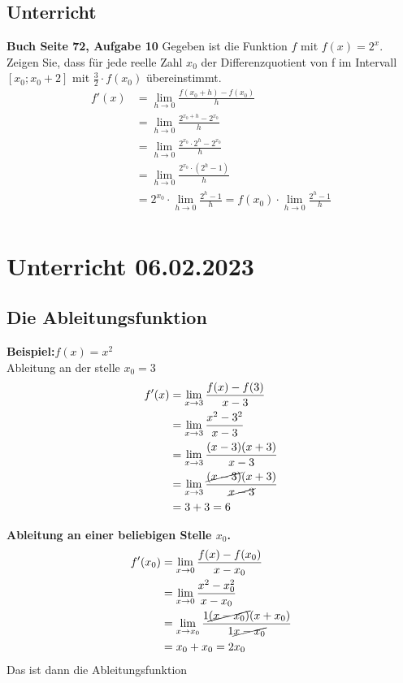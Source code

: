 \documentclass{book}
\begin{document}
\subsection{Unterricht}
\textbf{Buch Seite 72, Aufgabe 10}
Gegeben ist die Funktion $f$ mit $f(x)=2^x$. Zeigen Sie, dass für jede reelle Zahl $x_0$ der Differenzquotient von f im Intervall $[x_0; x_0+2]$ mit $\frac{3}{2}\cdot f(x_0)$ übereinstimmt. 
\begin{align*}
    f'(x) &= \lim_{h \to 0}\frac{f(x_0+h)-f(x_0)}{h} \\
          &= \lim_{h \to 0}\frac{2^{x_0+h}-2^{x_0}}{h} \\
          &= \lim_{h \to 0}\frac{2^{x_0}\cdot 2^h-2^{x_0}}{h} \\
          &= \lim_{h \to 0}\frac{2^{x_0}\cdot (2^h-1)}{h} \\
          &= 2^{x_0}\cdot \lim_{h \to 0}\frac{2^h-1}{h}=f(x_0)\cdot \lim_{h \to 0}\frac{2^h-1}{h} \\
\end{align*}

\section{Unterricht 06.02.2023}
\subsection{Die Ableitungsfunktion}
\textbf{Beispiel:}$f(x)=x^2$\\
Ableitung an der stelle $x_0=3$
\begin{align*}
  f'(x) &= \lim_{x \to 3}\frac{f(x)-f(3)}{x-3}\\
&= \lim_{x \to 3}\frac{x^2-3^2}{x-3}\\
&=\lim_{x \to 3}\frac{(x-3)(x+3)}{x-3}\\
&=\lim_{x\to3} \frac{\cancel{(x-3)}(x+3)}{\cancel{x-3}}\\
&=3+3=6\\
\end{align*}

\noindent\textbf{Ableitung an einer beliebigen Stelle $x_0$.}\\
\begin{align*}
  f'(x_0)&=\lim_{x\to 0}\frac{f(x)-f(x_0)}{x-x_0}\\
  &= \lim_{x\to 0}\frac{x^2-x_0^2}{x-x_0}\\
  &=\lim_{x\to x_0}\frac{1\cancel{(x-x_0)}(x+x_0)}{1\cancel{x-x_0}}\\
  &=x_0+x_0=2x_0\\
\end{align*}
Das ist dann die Ableitungsfunktion
\end{document}
